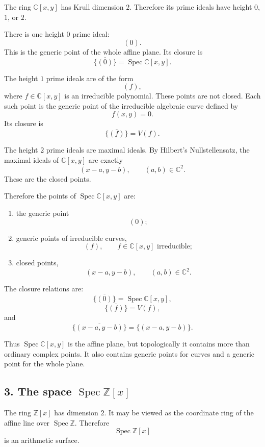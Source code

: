 \documentclass[12pt,a4paper]{article}
\newcommand{\Spec}{\operatorname{Spec}}
\begin{document}
	The ring \(\mathbb C[x,y]\) has Krull dimension \(2\). Therefore its prime ideals
	have height \(0\), \(1\), or \(2\).
	
	There is one height \(0\) prime ideal:
	\[
	(0).
	\]
	This is the generic point of the whole affine plane. Its closure is
	\[
	\overline{\{(0)\}}=\Spec\mathbb C[x,y].
	\]
	
	The height \(1\) prime ideals are of the form
	\[
	(f),
	\]
	where \(f\in\mathbb C[x,y]\) is an irreducible polynomial. These points are not
	closed. Each such point is the generic point of the irreducible algebraic curve
	defined by
	\[
	f(x,y)=0.
	\]
	Its closure is
	\[
	\overline{\{(f)\}}=V(f).
	\]
	
	The height \(2\) prime ideals are maximal ideals. By Hilbert's Nullstellensatz,
	the maximal ideals of \(\mathbb C[x,y]\) are exactly
	\[
	(x-a,y-b),
	\qquad (a,b)\in\mathbb C^2.
	\]
	These are the closed points.
	
	Therefore the points of \(\Spec\mathbb C[x,y]\) are:
	
	\begin{enumerate}[label=\arabic*)]
		\item the generic point
		\[
		(0);
		\]
		
		\item generic points of irreducible curves,
		\[
		(f),
		\qquad f\in\mathbb C[x,y]\text{ irreducible};
		\]
		
		\item closed points,
		\[
		(x-a,y-b),
		\qquad (a,b)\in\mathbb C^2.
		\]
	\end{enumerate}
	
	The closure relations are:
	\[
	\overline{\{(0)\}}=\Spec\mathbb C[x,y],
	\]
	\[
	\overline{\{(f)\}}=V(f),
	\]
	and
	\[
	\overline{\{(x-a,y-b)\}}=\{(x-a,y-b)\}.
	\]
	
	Thus \(\Spec\mathbb C[x,y]\) is the affine plane, but topologically it contains
	more than ordinary complex points. It also contains generic points for curves
	and a generic point for the whole plane.
	
	\subsection*{3. The space \(\Spec \mathbb Z[x]\)}
	
	The ring \(\mathbb Z[x]\) has dimension \(2\). It may be viewed as the coordinate
	ring of the affine line over \(\Spec\mathbb Z\). Therefore
	\[
	\Spec\mathbb Z[x]
	\]
	is an arithmetic surface.
	
\end{document}
